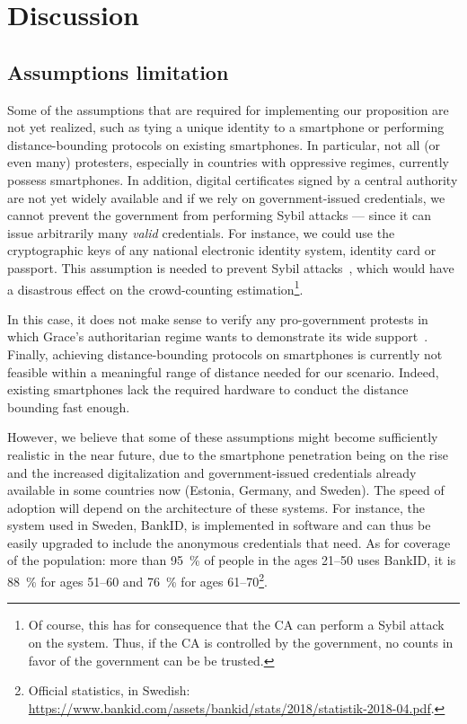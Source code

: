 \section{Discussion}%
\label{Discussion}




\subsection{Assumptions limitation} 

Some of the assumptions that are required for implementing our proposition are not yet realized, such as tying a unique identity to a smartphone or performing distance-bounding protocols on existing smartphones. 
In particular, not all (or even many) protesters, especially in countries with oppressive regimes, currently possess smartphones.
In addition, digital certificates signed by a central authority are not yet widely available and if we rely on government-issued credentials, we cannot prevent the government from performing Sybil attacks --- since it can issue arbitrarily many \emph{valid} credentials.  For instance, we could use the cryptographic keys of any national electronic identity system, identity card or passport.
This assumption is needed to prevent Sybil attacks~\cite{SybilAttack}, which would have a disastrous effect on the crowd-counting estimation\footnote{
Of course, this has for consequence that the \ac{CA} can perform a Sybil attack on the system.
Thus, if the \ac{CA} is controlled by the government, no counts in favor of the government can be be trusted.
}.

In this case, it does not make sense to verify any pro-government protests in which Grace's authoritarian regime wants to demonstrate its wide support~\cite{AlJazeeraOnVenezuela2017,VenezuelanStateWorkersCalledToParticipate}.
Finally, achieving distance-bounding protocols on smartphones is currently not feasible within a meaningful range of distance needed for our scenario.
Indeed, existing smartphones lack the required hardware to conduct the distance bounding fast enough.

However, we believe that some of these assumptions might become sufficiently realistic in the near future, due to the smartphone penetration being on the rise and the increased digitalization and government-issued credentials already available in some countries now (\eg Estonia, Germany, and Sweden). 
The speed of adoption will depend on the architecture of these systems.
For instance, the system used in Sweden, BankID, is implemented in software and can thus be easily upgraded to include the anonymous credentials that \CROCUS need.
As for coverage of the population: more than \SI{95}{\%} of people in the ages 21--50 uses BankID, it is \SI{88}{\%} for ages 51--60 and \SI{76}{\%} for ages 61--70\footnote{Official statistics, in Swedish:  \url{https://www.bankid.com/assets/bankid/stats/2018/statistik-2018-04.pdf}.}.

